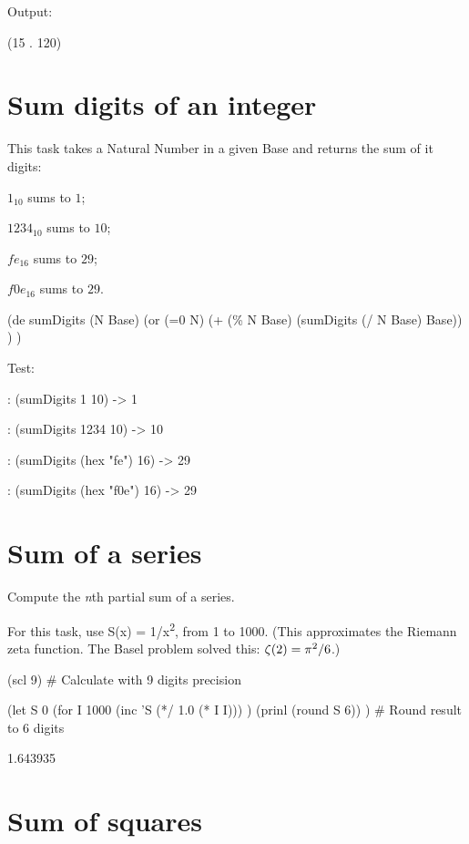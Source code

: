 \begin{itemize}
\begin{wideverbatim}
Output:

(15 . 120)

\end{wideverbatim}

\pagebreak{}
\section*{Sum digits of an integer}

This task takes a Natural Number in a given Base and returns the sum of
it digits:

$1_{10}$ sums to $1$;

$1234_{10}$ sums to $10$;

$fe_{16}$ sums to $29$;

$f0e_{16}$ sums to $29$.


\begin{wideverbatim}

(de sumDigits (N Base)
   (or
      (=0 N)
      (+ (\% N Base) (sumDigits (/ N Base) Base)) ) )

Test:

: (sumDigits 1 10)
-> 1

: (sumDigits 1234 10)
-> 10

: (sumDigits (hex "fe") 16)
-> 29

: (sumDigits (hex "f0e") 16)
-> 29

\end{wideverbatim}

\pagebreak{}
\section*{Sum of a series}

Compute the \emph{n}th partial sum of a series.

For this task, use S(x) = 1/x\textsuperscript{2}, from 1 to 1000. (This
approximates the Riemann zeta function. The Basel problem solved this:
$\zeta(2) = \pi\textsuperscript{2}/6$.)

\begin{wideverbatim}

(scl 9)  # Calculate with 9 digits precision

(let S 0
   (for I 1000
      (inc 'S (*/ 1.0 (* I I))) )
   (prinl (round S 6)) )  # Round result to 6 digits

1.643935

\end{wideverbatim}

\pagebreak{}
\section*{Sum of squares}


\end{itemize}
